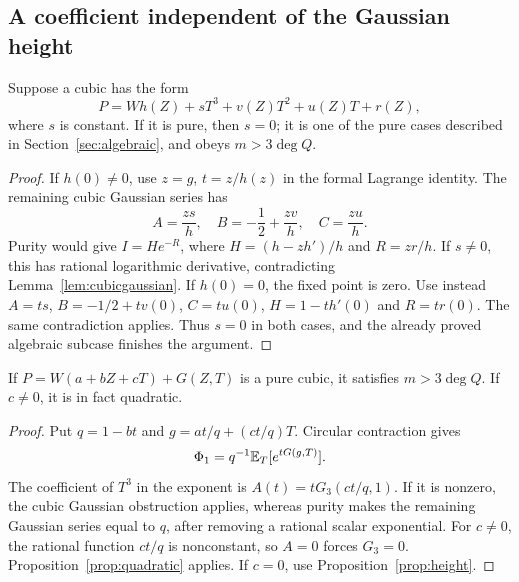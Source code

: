 \subsection{A coefficient independent of the Gaussian height}\label{sec:heightcases}

\begin{proposition}\label{prop:height}
Suppose a cubic has the form
\[
 P=Wh(Z)+sT^3+v(Z)T^2+u(Z)T+r(Z),
\]
where $s$ is constant. If it is pure, then $s=0$; it is one of the
pure cases described in Section~\ref{sec:algebraic}, and obeys
$m>3\deg Q$.
\end{proposition}
\begin{proof}
If $h(0)\ne0$, use $z=g$, $t=z/h(z)$ in the formal Lagrange
identity. The remaining cubic Gaussian series has
\[
 A=\frac{zs}{h},\quad B=-\frac12+\frac{zv}{h},\quad C=\frac{zu}{h}.
\]
Purity would give $I=H e^{-R}$, where
$H=(h-zh')/h$ and $R=zr/h$. If $s\ne0$, this has rational
logarithmic derivative, contradicting Lemma~\ref{lem:cubicgaussian}.
If $h(0)=0$, the fixed point is zero. Use instead
$A=ts$, $B=-1/2+tv(0)$, $C=tu(0)$, $H=1-th'(0)$ and $R=tr(0)$.
The same contradiction applies. Thus $s=0$ in both cases, and the
already proved algebraic subcase finishes the argument.
\end{proof}

\begin{corollary}\label{cor:linearwt}
If $P=W(a+bZ+cT)+G(Z,T)$ is a pure cubic, it satisfies
$m>3\deg Q$. If $c\ne0$, it is in fact quadratic.
\end{corollary}
\begin{proof}
Put $q=1-bt$ and $g=at/q+(ct/q)T$. Circular contraction gives
\[
 \Phi_1=q^{-1}\mathbb E_T[e^{tG(g,T)}].
\]
The coefficient of $T^3$ in the exponent is
$A(t)=tG_3(ct/q,1)$. If it is nonzero, the cubic Gaussian
obstruction applies, whereas purity makes the remaining Gaussian
series equal to $q$, after removing a rational scalar exponential.
For $c\ne0$, the rational function $ct/q$ is nonconstant, so
$A=0$ forces $G_3=0$. Proposition~\ref{prop:quadratic} applies.
If $c=0$, use Proposition~\ref{prop:height}.
\end{proof}

